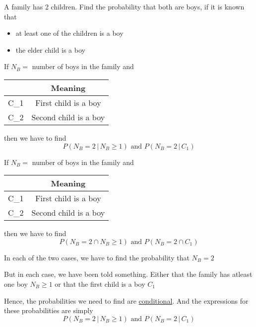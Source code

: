 \documentclass[14pt,fleqn]{extarticle}
\begin{document}
A family has 2 children. Find the probability
that both are boys, if it is known that 

\begin{itemize}
\item {at least one of the children is a boy}
\item {the elder child is a boy}
\end{itemize}

%

\newcard

If $N_B = $ number of boys in the family and 
\begin{center}
  \begin{tabular}{Nc}
  \toprule
         & Meaning \\
   \midrule
   C_1 & First child is a boy \\ 
    \midrule 
    C_2 & Second child is a boy \\
    \bottomrule
  \end{tabular}
\end{center}

then we have to find 
\[ P\left( N_B = 2\,\vert\, N_B\geq 1\right)\text{ and } P\left( N_B=2\,\vert\, C_1\right)\]

\newcard

If $N_B = $ number of boys in the family and 
\begin{center}
  \begin{tabular}{Nc}
  \toprule
         & Meaning \\
   \midrule
   C_1 & First child is a boy \\ 
    \midrule 
    C_2 & Second child is a boy \\
    \bottomrule
  \end{tabular}
\end{center}

then we have to find 
\[ P\left( N_B = 2\cap N_B\geq 1\right)\text{ and } P\left( N_B=2\cap C_1\right)\]

\newcard 

In each of the two cases, we have to find the probability that $N_B=2$\newline 

But in each case, we have been told something. Either that the family has atleast one 
boy $N_B\geq 1$ or that the first child is a boy $C_1$\newline 

Hence, the probabilities we need to find are \underline{conditional}. And the 
expressions for these probabilities are simply 
\[ P\left( N_B=2\,\vert\, N_B\geq 1\right)\text{ and } P\left( N_B=2\,\vert\, C_1\right)\]
\end{document}
